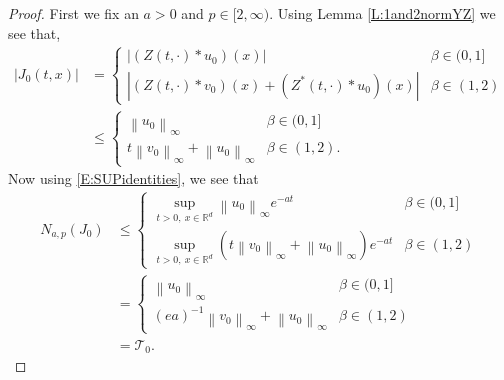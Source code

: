 \documentclass[a4paper,11pt]{article}
\numberwithin{equation}{section}
\theoremstyle{plain}
\theoremstyle{definition}
\newcommand{\Norm}[1]{\left\|  #1   \right\|}
\newcommand{\R}{\mathbb{R}}
\numberwithin{NQ}{section}
\numberwithin{LQ}{section}
\numberwithin{ZQ}{section}
\begin{document}
\begin{proof}
  First we fix an $a>0$ and $p \in [2,\infty)$. Using Lemma \ref{L:1and2normYZ} we see that,
  \begin{align*}
  |J_0(t,x)|  &= \begin{cases}
  \left| (Z(t,\cdot) * u_0)(x)  \right| & \beta \in (0,1]
  \\	\left| (Z(t,\cdot) * v_0)(x) + (Z^*(t,\cdot) * u_0)(x) \right| & \beta \in (1,2)
  \end{cases}
  \\& \le \begin{cases}
  \Norm{u_0}_\infty & \beta \in (0,1]
  \\ t\Norm{v_0}_\infty + \Norm{u_0}_\infty & \beta \in (1,2).
  \end{cases}
  \end{align*}
  Now using \eqref{E:SUPidentities}, we see that
      \begin{align}
  N_{a,p}(J_0) &\le \begin{cases}
  \sup\limits_{t > 0, \: x\in\R^d}  \Norm{u_0}_\infty e^{-at} & \beta \in (0,1]
  \\ \sup\limits_{t > 0, \: x\in\R^d} \left(  t\Norm{v_0}_\infty + \Norm{u_0}_\infty \right) e^{-at} & \beta \in (1,2)
  \end{cases} \nonumber \\
  &= \begin{cases}
 \Norm{u_0}_\infty  & \beta \in (0,1]
  \\(ea)^{-1} \Norm{v_0}_\infty + \Norm{u_0}_\infty & \beta \in (1,2)
  \end{cases} \nonumber \\
  &= \mathcal{T}_0. \label{E:Jbdd}
  \end{align}

\end{proof}
\end{document}
